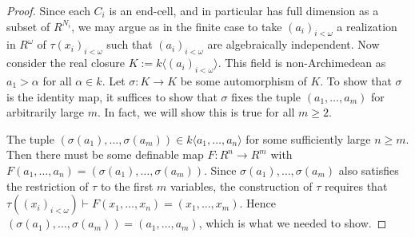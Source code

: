 \documentclass[10pt,a4paper]{amsart}
\begin{document}
\begin{proof}
    Since each $C_i$ is an end-cell, and in particular has full dimension as a subset of $R^{N_i}$, we may argue as in the finite case to take $(a_i)_{i<\omega}$ a realization in $R^\omega$ of $\tau(x_i)_{i<\omega}$ such that $(a_i)_{i<\omega}$ are algebraically independent. Now consider the real closure $K:=k\langle (a_i)_{i<\omega}\rangle$. This field is non-Archimedean as $a_1>\alpha$ for all $\alpha\in k$. Let $\sigma:K\to K$ be some automorphism of $K$. To show that $\sigma$ is the identity map, it suffices to show that $\sigma$ fixes the tuple $(a_1,\dots,a_m)$ for arbitrarily large $m$. In fact, we will show this is true for all $m\geq 2$.

    The tuple $(\sigma(a_1),\dots,\sigma(a_m))\in k\langle a_1,\dots,a_n\rangle$ for some sufficiently large $n\geq m$. Then there must be some definable map $F:R^n\to R^m$ with $F(a_1,\dots,a_n)=(\sigma(a_1),\dots,\sigma(a_m))$. Since $\sigma(a_1),\dots,\sigma(a_m)$ also satisfies the restriction of $\tau$ to the first $m$ variables, the construction of $\tau$ requires that $\tau((x_i)_{i<\omega})\vdash F(x_1,\dots,x_n)=(x_1,\dots,x_m)$. Hence $(\sigma(a_1),\dots,\sigma(a_m))=(a_1,\dots,a_m)$, which is what we needed to show.
\end{proof}
\end{document}
